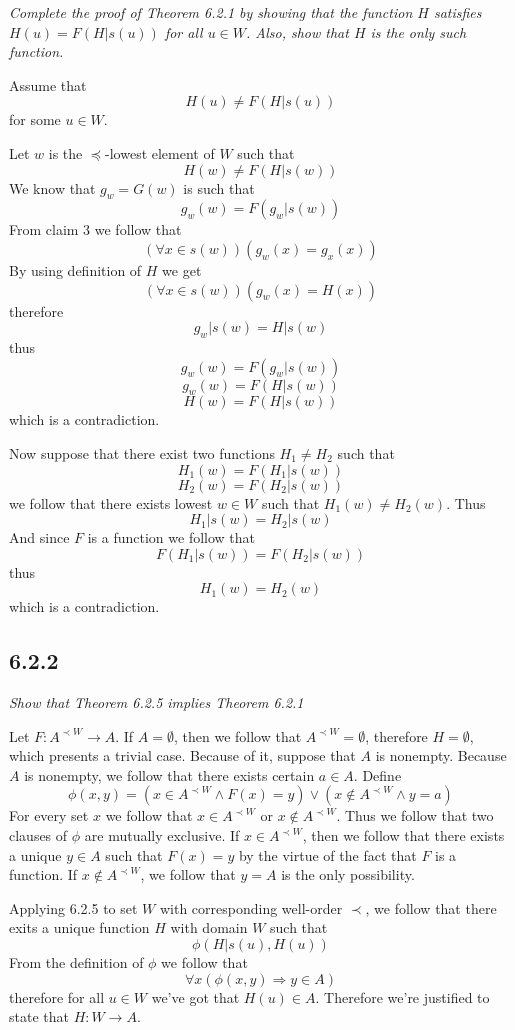 \documentclass[11pt,oneside,titlepage]{book}
\DeclareMathOperator \ra {\Rightarrow}
\begin{document}
\textit{Complete the proof of Theorem 6.2.1 by showing that the function $H$ satisfies
  $H(u) = F(H|s(u))$ for all $u \in W$. Also, show that $H$ is the only such function.}

Assume that 
$$H(u) \neq F(H|s(u))$$
for some $u \in W$.

Let $w$ is the $\preceq$-lowest element of $W$ such that
$$H(w) \neq F(H|s(w))$$
We know that $g_w = G(w)$ is such that
$$g_w(w) = F(g_w|s(w))$$
From claim 3 we follow that
$$(\forall x \in s(w))(g_w(x) = g_x(x))$$
By using definition of $H$  we get
$$(\forall x \in s(w))(g_w(x) = H(x))$$
therefore
$$g_w|s(w) = H|s(w)$$
thus
$$g_w(w) = F(g_w|s(w))$$
$$g_w(w) = F(H|s(w))$$
$$H(w) = F(H|s(w))$$
which is a contradiction.

Now suppose that there exist two functions $H_1 \neq H_2$  such that
$$H_1(w) = F(H_1|s(w))$$
$$H_2(w) = F(H_2|s(w))$$
we follow that there exists lowest $w \in W$ such that $H_1(w) \neq H_2(w)$. Thus
$$H_1|s(w) = H_2|s(w)$$
And since $F$ is a function we follow that 
$$F(H_1|s(w)) = F(H_2|s(w))$$
thus
$$H_1(w) = H_2(w)$$
which is a contradiction.

\subsection*{6.2.2}

\textit{Show that Theorem 6.2.5 implies Theorem 6.2.1}

Let $F: A^{\prec W} \to A$. If $A = \emptyset$, then we follow that $A^{\prec W} = \emptyset$,
therefore $H = \emptyset$, which presents a trivial case. Because of it, suppose that
$A$ is nonempty. Because $A$ is nonempty, we follow that there exists certain $a \in A$.
Define
$$\phi(x, y) = (x \in A^{\prec W} \land F(x) = y) \lor(x \notin A^{\prec W} \land y = a)$$
For every set $x$ we follow that $x \in A^{\prec W}$ or $x \notin A^{\prec W}$. Thus
we follow that two clauses of $\phi$ are mutually exclusive. 
If $x \in A^{\prec W}$, then we follow that there exists a unique $y \in A$ such that
$F(x) = y$ by the virtue of the fact that $F$ is a function.
If $x \notin A^{\prec W}$, we follow that $y = A$ is the only possibility.

Applying 6.2.5 to set $W$ with corresponding well-order $\prec$, we follow that there
exits a unique function $H$ with domain $W$ such that
$$\phi(H|s(u), H(u))$$
From the definition of $\phi$ we follow that
$$\forall x(\phi(x, y) \ra y \in A)$$
therefore for all $u \in W$ we've got that $H(u) \in A$. Therefore we're justified
to state that $H: W \to A$.
\end{document}
